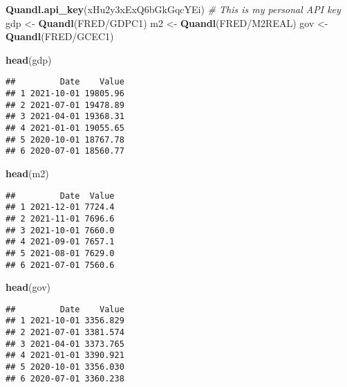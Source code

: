 \documentclass[
]{article}
\newenvironment{Shaded}{\begin{snugshade}}{\end{snugshade}}
\newcommand{\CommentTok}[1]{\textcolor[rgb]{0.56,0.35,0.01}{\textit{#1}}}
\newcommand{\FunctionTok}[1]{\textcolor[rgb]{0.13,0.29,0.53}{\textbf{#1}}}
\newcommand{\NormalTok}[1]{#1}
\newcommand{\OtherTok}[1]{\textcolor[rgb]{0.56,0.35,0.01}{#1}}
\newcommand{\StringTok}[1]{\textcolor[rgb]{0.31,0.60,0.02}{#1}}
\begin{document}
\begin{Shaded}
\begin{Highlighting}[]
\FunctionTok{Quandl.api\_key}\NormalTok{(}\StringTok{\textquotesingle{}xHu2y3xExQ6bGkGqcYEi\textquotesingle{}}\NormalTok{) }\CommentTok{\# This is my personal API key}
\NormalTok{gdp }\OtherTok{\textless{}{-}} \FunctionTok{Quandl}\NormalTok{(}\StringTok{\textquotesingle{}FRED/GDPC1\textquotesingle{}}\NormalTok{)}
\NormalTok{m2 }\OtherTok{\textless{}{-}} \FunctionTok{Quandl}\NormalTok{(}\StringTok{\textquotesingle{}FRED/M2REAL\textquotesingle{}}\NormalTok{)}
\NormalTok{gov }\OtherTok{\textless{}{-}} \FunctionTok{Quandl}\NormalTok{(}\StringTok{\textquotesingle{}FRED/GCEC1\textquotesingle{}}\NormalTok{)}

\FunctionTok{head}\NormalTok{(gdp)}
\end{Highlighting}
\end{Shaded}

\begin{verbatim}
##         Date    Value
## 1 2021-10-01 19805.96
## 2 2021-07-01 19478.89
## 3 2021-04-01 19368.31
## 4 2021-01-01 19055.65
## 5 2020-10-01 18767.78
## 6 2020-07-01 18560.77
\end{verbatim}

\begin{Shaded}
\begin{Highlighting}[]
\FunctionTok{head}\NormalTok{(m2)}
\end{Highlighting}
\end{Shaded}

\begin{verbatim}
##         Date  Value
## 1 2021-12-01 7724.4
## 2 2021-11-01 7696.6
## 3 2021-10-01 7660.0
## 4 2021-09-01 7657.1
## 5 2021-08-01 7629.0
## 6 2021-07-01 7560.6
\end{verbatim}

\begin{Shaded}
\begin{Highlighting}[]
\FunctionTok{head}\NormalTok{(gov)}
\end{Highlighting}
\end{Shaded}

\begin{verbatim}
##         Date    Value
## 1 2021-10-01 3356.829
## 2 2021-07-01 3381.574
## 3 2021-04-01 3373.765
## 4 2021-01-01 3390.921
## 5 2020-10-01 3356.030
## 6 2020-07-01 3360.238
\end{verbatim}
\end{document}
